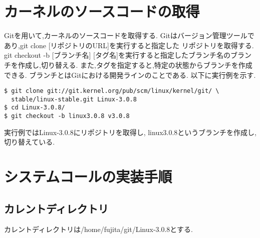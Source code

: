 \documentclass[12pt]{jsarticle}
\begin{document}
\section{カーネルのソースコードの取得}
Gitを用いて,カーネルのソースコードを取得する.
Gitはバージョン管理ツールであり,git clone [リポジトリのURL]を実行すると指定した
リポジトリを取得する.
git checkout -b [ブランチ名] [タグ名]を実行すると指定したブランチ名のブランチを作成し,切り替える.
また,タグを指定すると,特定の状態からブランチを作成できる.
ブランチとはGitにおける開発ラインのことである.
以下に実行例を示す.
\begin{verbatim}
$ git clone git://git.kernel.org/pub/scm/linux/kernel/git/ \
  stable/linux-stable.git Linux-3.0.8
$ cd Linux-3.0.8/
$ git checkout -b linux3.0.8 v3.0.8  
\end{verbatim}
実行例ではLinux-3.0.8にリポジトリを取得し,
linux3.0.8というブランチを作成し,切り替えている.
\section{システムコールの実装手順}
\subsection{カレントディレクトリ}
カレントディレクトリは/home/fujita/git/Linux-3.0.8とする.
\end{document}
